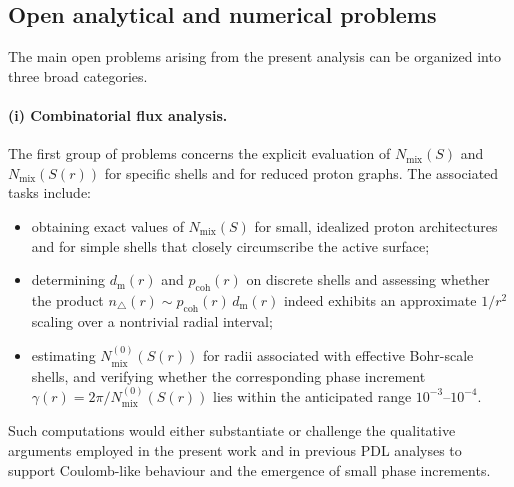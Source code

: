\documentclass[11pt,a4paper]{article}
\begin{document}
\subsection*{Open analytical and numerical problems}

The main open problems arising from the present analysis can be organized into three broad categories.

\paragraph{(i) Combinatorial flux analysis.}
The first group of problems concerns the explicit evaluation of $N_{\mathrm{mix}}(S)$ and $N_{\mathrm{mix}}(S(r))$ for specific shells and for reduced proton graphs. The associated tasks include:
\begin{itemize}
  \item obtaining exact values of $N_{\mathrm{mix}}(S)$ for small, idealized proton architectures and for simple shells that closely circumscribe the active surface;
  \item determining $d_{\mathrm{m}}(r)$ and $p_{\mathrm{coh}}(r)$ on discrete shells and assessing whether the product $n_{\triangle}(r)\sim p_{\mathrm{coh}}(r)\,d_{\mathrm{m}}(r)$ indeed exhibits an approximate $1/r^{2}$ scaling over a nontrivial radial interval;
  \item estimating $N_{\mathrm{mix}}^{(0)}(S(r))$ for radii associated with effective Bohr-scale shells, and verifying whether the corresponding phase increment $\gamma(r)=2\pi/N_{\mathrm{mix}}^{(0)}(S(r))$ lies within the anticipated range $10^{-3}$–$10^{-4}$.\cite{Laubscher2026SchrodingerSketch}
\end{itemize}
Such computations would either substantiate or challenge the qualitative arguments employed in the present work and in previous PDL analyses to support Coulomb-like behaviour and the emergence of small phase increments.
\end{document}
